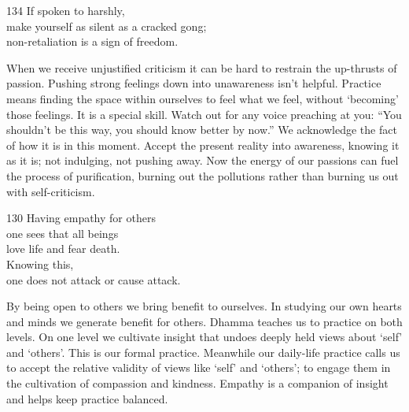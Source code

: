 
\begin{dhpVerse}{134}
\label{dhp-134}
If spoken to harshly,\\
make yourself as silent as a cracked gong;\\
non-retaliation is a sign of freedom.
\end{dhpVerse}

\begin{dhpRefl}

When we receive unjustified criticism it can be hard to restrain the
up-thrusts of passion. Pushing strong feelings down into unawareness
isn't helpful. Practice means finding the space within ourselves to
feel what we feel, without `becoming' those feelings. It is a special
skill. Watch out for any voice preaching at you: ``You shouldn't be
this way, you should know better by now.'' We acknowledge the fact of
how it is in this moment. Accept the present reality into awareness,
knowing it as it is; not indulging, not pushing away. Now the energy
of our passions can fuel the process of purification, burning out the
pollutions rather than burning us out with self-criticism.

\end{dhpRefl}


\begin{dhpVerse}{130}
\label{dhp-130}
Having empathy for others\\
one sees that all beings\\
love life and fear death.\\
Knowing this,\\
one does not attack or cause attack.
\end{dhpVerse}

\begin{dhpRefl}

By being open to others we bring benefit to ourselves. In studying
our own hearts and minds we generate benefit for others. Dhamma
teaches us to practice on both levels. On one level we cultivate
insight that undoes deeply held views about `self' and `others'. This
is our formal practice. Meanwhile our daily-life practice calls us to
accept the relative validity of views like `self' and `others'; to
engage them in the cultivation of compassion and kindness. Empathy is
a companion of insight and helps keep practice balanced.

\end{dhpRefl}

